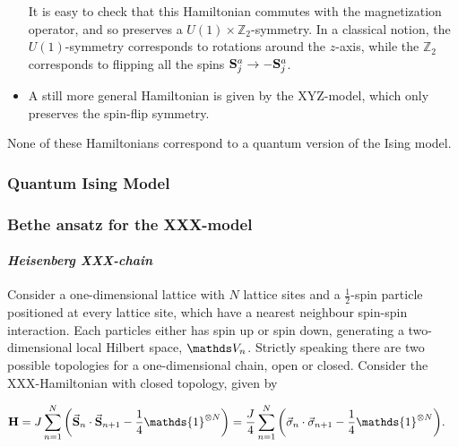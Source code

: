 \documentclass{homework}
\begin{document}
\begin{itemize}
It is easy to check that this Hamiltonian commutes with the magnetization operator, and so preserves a $U(1)\times \mathds{Z}_2$-symmetry. In a classical notion, the $U(1)$-symmetry corresponds to rotations around the $z$-axis, while the $\mathds{Z}_2$ corresponds to flipping all the spins ${{\bf S}_j^a \rightarrow -{\bf S}_j^a}$. \\

\item A still more general Hamiltonian is given by the XYZ-model, which only preserves the spin-flip symmetry. 
\end{itemize}

None of these Hamiltonians correspond to a quantum version of the Ising model. \\

\subsubsection{Quantum Ising Model}

\clearpage

\subsubsection{\textbf{Bethe ansatz for the XXX-model}}

\paragraph{\textit{Heisenberg XXX-chain}}

Consider a one-dimensional lattice with $N$ lattice sites and a $\frac{1}{2}$-spin particle positioned at every lattice site, which have a nearest neighbour spin-spin interaction. Each particles either has spin up or spin down, generating a two-dimensional local Hilbert space, $\vds_n$. Strictly speaking there are two possible topologies for a one-dimensional chain, open or closed. Consider the XXX-Hamiltonian with closed topology, given by 

\begin{equation}
\begin{split}
    {\bf H} &= J \sum_{n=1}^{N} \bigg(\vec{\spin}_n \cdot \vec{\spin}_{n+1} - \frac{1}{4} \mathds{1}^{\otimes N} \bigg) = \frac{J}{4}\sum_{n=1}^{N} \bigg(\vec{\sigma}_n \cdot \vec{\sigma}_{n+1} - \frac{1}{4} \mathds{1}^{\otimes N} \bigg).
    \label{XXX model}
\end{split}
\end{equation}
\end{document}
